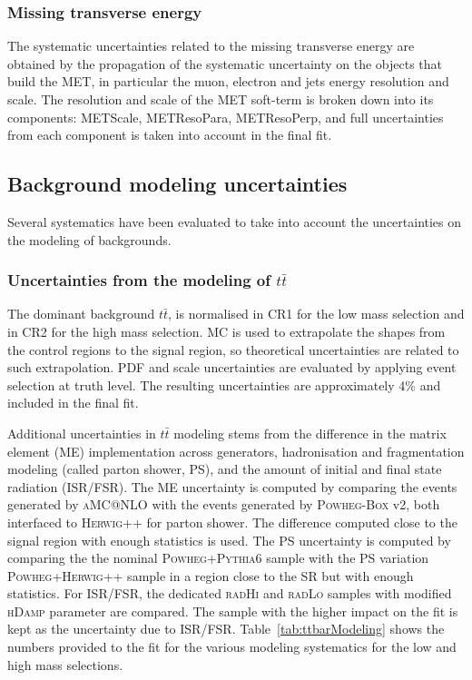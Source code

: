 \subsubsection{Missing transverse energy}
The systematic uncertainties related to the missing transverse energy
are obtained by the propagation of the systematic uncertainty on the
objects that build the MET, in particular the muon, electron and jets
energy resolution and scale. 
The resolution and scale of the MET soft-term is broken down into its components: METScale, METResoPara, METResoPerp, and full uncertainties from each component is taken into account in the final fit. 
 
\subsection{Background modeling uncertainties}
Several systematics have been evaluated to take into account the
uncertainties on the modeling of backgrounds. 

\subsubsection{Uncertainties from the modeling of $t\bar{t}$}
\label{sec:topsys}
The dominant background $t\bar{t}$, is normalised in CR1 for the low
mass selection and in CR2 for the high mass selection. MC is used to extrapolate the shapes from the control regions to the signal region, so theoretical uncertainties are related to such extrapolation. PDF and scale uncertainties are evaluated by applying event selection at truth level. The resulting uncertainties are approximately 4\% and included in the final fit.  

Additional uncertainties in $t\bar{t}$ modeling stems from the difference in the matrix element (ME) implementation across generators, hadronisation and fragmentation modeling (called parton shower, PS), and the amount of initial and final state radiation (ISR/FSR). The ME uncertainty is computed by comparing the events generated by \textsc{aMC@NLO} with the events generated by \textsc{Powheg-Box} v2, both interfaced to \textsc{Herwig++}  for parton shower. The difference computed close to the signal region with enough statistics is used. The PS uncertainty is computed by comparing the the nominal \textsc{Powheg+Pythia6} sample with the PS variation \textsc{Powheg+Herwig++} sample in a region close to the SR but with enough statistics. For ISR/FSR, the dedicated \textsc{radHi} and \textsc{radLo} samples with modified \textsc{hDamp} parameter are compared. The sample with the higher impact on the fit is kept as the uncertainty due to ISR/FSR. Table~\ref{tab:ttbarModeling} shows the numbers provided to the fit for the various \ttbar modeling systematics for the low and high mass selections.

